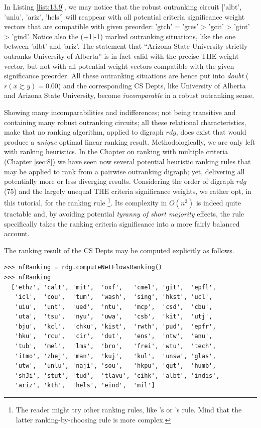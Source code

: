 In Listing \ref{list:13.9}, we may notice that the robust outranking circuit ['albt', 'unlu', 'ariz', 'hels']  will reappear with all potential criteria significance weight vectors that are compatible with given preorder: 'gtch' = 'gres' > 'gcit' > 'gint' > 'gind'. Notice also the (+1|-1) marked outranking situations, like the one between 'albt' and 'ariz'. The statement that ``Arizona State University strictly  outranks University of Alberta'' is in fact valid with the precise THE weight vector, but not with all potential weight vectors compatible with the given significance preorder. All these outranking situations are hence put into \emph{doubt} ($r(x \succsim y) = 0.00$) and the corresponding CS Depts, like University of Alberta and Arizona State University, become \emph{incomparable} in a robust outranking sense.  

Showing many incomparabilities and indifferences; not being transitive and containing many robust outranking circuits; all these relational characteristics, make that no ranking algorithm, applied to digraph $rdg$, does exist that would produce a \emph{unique} optimal linear ranking result. Methodologically, we are only left with ranking heuristics. In the Chapter on ranking with multiple criteria (Chapter \ref{sec:8}) we have seen now several potential heuristic ranking rules that may be applied to rank from a pairwise outranking digraph; yet, delivering all potentially more or less diverging results. Considering the order of digraph $rdg$ (75) and the largely unequal THE criteria significance weights, we rather opt, in this tutorial, for the \NetFlows ranking rule \footnote{The reader might try other ranking rules, like \Copeland's or \Kohler's rule. Mind that the latter ranking-by-choosing rule is more complex.}. Its complexity in $O(n^2)$ is indeed quite tractable and, by avoiding potential \emph{tyranny of short majority} effects, the \NetFlows rule specifically takes the ranking criteria significance into a more fairly balanced account.

The \NetFlows ranking result of the CS Depts may be computed explicitly as follows. 

\begin{lstlisting}[caption={Showing the relation table with stability denotation},label=list:13.9]
>>> nfRanking = rdg.computeNetFlowsRanking()
>>> nfRanking
  ['ethz', 'calt', 'mit',  'oxf',   'cmel', 'git',  'epfl',
   'icl',  'cou',  'tum',  'wash',  'sing', 'hkst', 'ucl',
   'uiu',  'unt',  'ued',  'ntu',   'mcp',  'csd',  'cbu',
   'uta',  'tsu',  'nyu',  'uwa',   'csb',  'kit',  'utj',
   'bju',  'kcl',  'chku', 'kist',  'rwth', 'pud',  'epfr',
   'hku',  'rcu',  'cir',  'dut',   'ens',  'ntw',  'anu',
   'tub',  'mel',  'lms',  'bro',   'frei', 'wtu',  'tech',
   'itmo', 'zhej', 'man',  'kuj',   'kul',  'unsw', 'glas',
   'utw',  'unlu', 'naji', 'sou',   'hkpu', 'qut',  'humb',
   'shJi', 'stut', 'tud',  'tlavu', 'cihk', 'albt', 'indis',
   'ariz', 'kth',  'hels', 'eind',  'mil']
\end{lstlisting}


